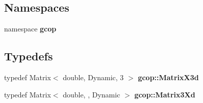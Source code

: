 \subsection*{\-Namespaces}
\begin{DoxyCompactItemize}
\item 
namespace {\bf gcop}
\end{DoxyCompactItemize}
\subsection*{\-Typedefs}
\begin{DoxyCompactItemize}
\item 
typedef \-Matrix$<$ double, \*
\-Dynamic, 3 $>$ {\bf gcop\-::\-Matrix\-X3d}
\item 
typedef \-Matrix$<$ double, , \-Dynamic $>$ {\bf gcop\-::\-Matrix3\-Xd}
\end{DoxyCompactItemize}
